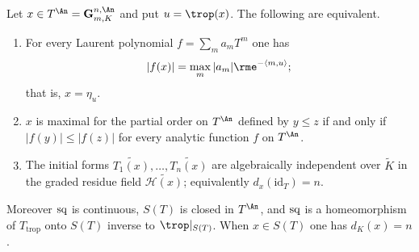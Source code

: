 \begin{proposition}
\label{prop:trop-torus-skeleton}
Let $x\in T^{\An}=\mathbf G_{m,K}^{n,\An}$ and put
$u=\trop(x)$. The following are equivalent.
\begin{enumerate}
\item\label{itm:trop-sk:eq} For every Laurent polynomial
  $f=\sum_ma_mT^m$ one has
  \[
   |f(x)|=\max_m|a_m|\rme^{-\langle m,u\rangle};
  \]
  that is, $x=\eta_u$.
\item\label{itm:trop-sk:max} $x$ is maximal for the partial order on
  $T^{\An}$ defined by $y\le z$ if and only if $|f(y)|\le|f(z)|$ for every
  analytic function $f$ on $T^{\An}$.
\item\label{itm:trop-sk:graded} The initial forms
  $\widetilde{T_1(x)},\ldots,\widetilde{T_n(x)}$ are algebraically
  independent over $\widetilde K$ in the graded residue field
  $\widetilde{\mathcal H(x)}$; equivalently $d_x(\mathrm{id}_T)=n$.
\end{enumerate}
Moreover $\operatorname{sq}$ is continuous, $S(T)$ is closed in $T^{\An}$, and $\operatorname{sq}$ is a
homeomorphism of $T_{\mathrm{trop}}$ onto $S(T)$ inverse to
$\trop|_{S(T)}$. When $x\in S(T)$ one has $d_K(x)=n$.
\end{proposition}

